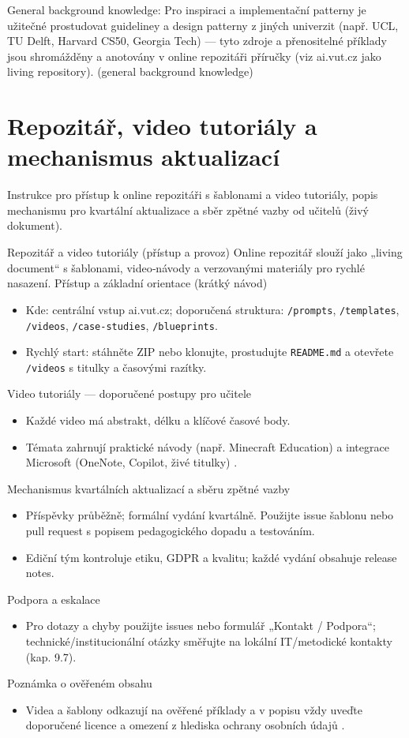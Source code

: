 \documentclass{report}%
\begin{document}
General background knowledge: Pro inspiraci a implementační patterny je užitečné prostudovat guideliney a design patterny z jiných univerzit (např. UCL, TU Delft, Harvard CS50, Georgia Tech) — tyto zdroje a přenositelné příklady jsou shromážděny a anotovány v online repozitáři příručky (viz ai.vut.cz jako living repository). (general background knowledge)%

%
\section{Repozitář, video tutoriály a mechanismus aktualizací}%
Instrukce pro přístup k online repozitáři s šablonami a video tutoriály, popis mechanismu pro kvartální aktualizace a sběr zpětné vazby od učitelů (živý dokument).%


%
Repozitář a video tutoriály (přístup a provoz)
Online repozitář slouží jako „living document“ s šablonami, video‑návody a verzovanými materiály pro rychlé nasazení.
Přístup a základní orientace (krátký návod)
\begin{itemize}
\item Kde: centrální vstup ai.vut.cz; doporučená struktura: \texttt{/prompts}, \texttt{/templates}, \texttt{/videos}, \texttt{/case‑studies}, \texttt{/blueprints}.
\item Rychlý start: stáhněte ZIP nebo klonujte, prostudujte \texttt{README.md} a otevřete \texttt{/videos} s titulky a časovými razítky.
\end{itemize}
Video tutoriály — doporučené postupy pro učitele
\begin{itemize}
\item Každé video má abstrakt, délku a klíčové časové body.
\item Témata zahrnují praktické návody (např. Minecraft Education) \cite{kb_ai_101_tipu_pdf_04e4a115_page_15_2} a integrace Microsoft (OneNote, Copilot, živé titulky) \cite{kb_ai_101_tipu_pdf_04e4a115_page_8_1, kb_ai_101_tipu_pdf_04e4a115_page_16_1}.
\end{itemize}
Mechanismus kvartálních aktualizací a sběru zpětné vazby
\begin{itemize}
\item Příspěvky průběžně; formální vydání kvartálně. Použijte issue šablonu nebo pull request s popisem pedagogického dopadu a testováním.
\item Ediční tým kontroluje etiku, GDPR a kvalitu; každé vydání obsahuje release notes.
\end{itemize}
Podpora a eskalace
\begin{itemize}
\item Pro dotazy a chyby použijte issues nebo formulář „Kontakt / Podpora“; technické/institucionální otázky směřujte na lokální IT/metodické kontakty (kap. 9.7).
\end{itemize}
Poznámka o ověřeném obsahu
\begin{itemize}
\item Videa a šablony odkazují na ověřené příklady a v popisu vždy uveďte doporučené licence a omezení z hlediska ochrany osobních údajů \cite{kb_ai_101_tipu_pdf_04e4a115_page_15_2, kb_ai_101_tipu_pdf_04e4a115_page_8_1, kb_ai_101_tipu_pdf_04e4a115_page_16_1}.
\end{itemize}%
\end{document}
